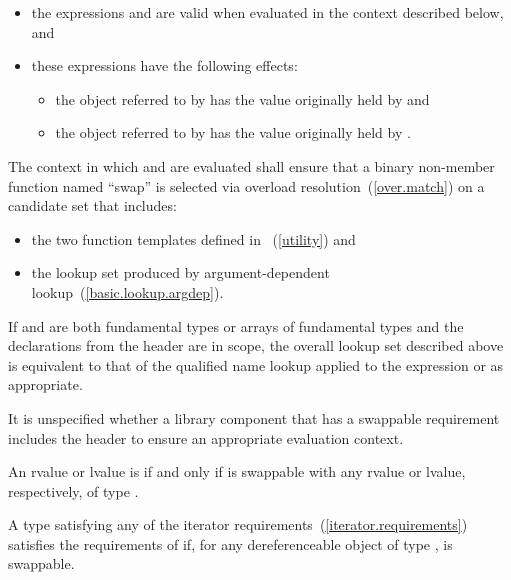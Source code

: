 \begin{itemize}
\item the expressions  and  are valid when
evaluated in the context described below, and

\item these expressions have the following effects:

\begin{itemize}
\item the object referred to by  has the value originally held by  and
\item the object referred to by  has the value originally held by .
\end{itemize}
\end{itemize}

\pnum
The context in which  and  are evaluated shall
ensure that a binary non-member function named ``swap'' is selected via overload
resolution~(\ref{over.match}) on a candidate set that includes:

\begin{itemize}
\item the two  function templates defined in
~(\ref{utility}) and

\item the lookup set produced by argument-dependent lookup~(\ref{basic.lookup.argdep}).
\end{itemize}

\begin{note} If  and  are both fundamental types or arrays of
fundamental types and the declarations from the header  are in
scope, the overall lookup set described above is equivalent to that of the
qualified name lookup applied to the expression  or
 as appropriate. \end{note}

\begin{note} It is unspecified whether a library component that has a swappable
requirement includes the header  to ensure an appropriate
evaluation context. \end{note}

\pnum
An rvalue or lvalue  is  if and only if  is
swappable with any rvalue or lvalue, respectively, of type .

\pnum
A type  satisfying any of the iterator requirements~(\ref{iterator.requirements})
satisfies the requirements of  if,
for any dereferenceable object
 of type ,
 is swappable.

